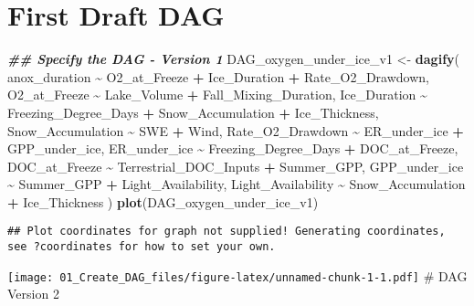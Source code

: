 \documentclass[
]{article}
\newenvironment{Shaded}{\begin{snugshade}}{\end{snugshade}}
\newcommand{\DocumentationTok}[1]{\textcolor[rgb]{0.56,0.35,0.01}{\textbf{\textit{#1}}}}
\newcommand{\FunctionTok}[1]{\textcolor[rgb]{0.13,0.29,0.53}{\textbf{#1}}}
\newcommand{\NormalTok}[1]{#1}
\newcommand{\OtherTok}[1]{\textcolor[rgb]{0.56,0.35,0.01}{#1}}
\newcommand{\SpecialCharTok}[1]{\textcolor[rgb]{0.81,0.36,0.00}{\textbf{#1}}}
\begin{document}
\section{First Draft DAG}\label{first-draft-dag}

\begin{Shaded}
\begin{Highlighting}[]
\DocumentationTok{\#\# Specify the DAG {-} Version 1}
\NormalTok{DAG\_oxygen\_under\_ice\_v1 }\OtherTok{\textless{}{-}} \FunctionTok{dagify}\NormalTok{(}
\NormalTok{  anox\_duration }\SpecialCharTok{\textasciitilde{}}\NormalTok{ O2\_at\_Freeze }\SpecialCharTok{+}\NormalTok{ Ice\_Duration }\SpecialCharTok{+}\NormalTok{ Rate\_O2\_Drawdown,}
\NormalTok{  O2\_at\_Freeze }\SpecialCharTok{\textasciitilde{}}\NormalTok{ Lake\_Volume }\SpecialCharTok{+}\NormalTok{ Fall\_Mixing\_Duration,}
\NormalTok{  Ice\_Duration }\SpecialCharTok{\textasciitilde{}}\NormalTok{ Freezing\_Degree\_Days }\SpecialCharTok{+}\NormalTok{ Snow\_Accumulation }\SpecialCharTok{+}\NormalTok{ Ice\_Thickness, }
\NormalTok{  Snow\_Accumulation }\SpecialCharTok{\textasciitilde{}}\NormalTok{ SWE }\SpecialCharTok{+}\NormalTok{ Wind,}
\NormalTok{  Rate\_O2\_Drawdown }\SpecialCharTok{\textasciitilde{}}\NormalTok{ ER\_under\_ice }\SpecialCharTok{+}\NormalTok{ GPP\_under\_ice, }
\NormalTok{  ER\_under\_ice }\SpecialCharTok{\textasciitilde{}}\NormalTok{ Freezing\_Degree\_Days }\SpecialCharTok{+}\NormalTok{ DOC\_at\_Freeze,}
\NormalTok{  DOC\_at\_Freeze }\SpecialCharTok{\textasciitilde{}}\NormalTok{ Terrestrial\_DOC\_Inputs }\SpecialCharTok{+}\NormalTok{ Summer\_GPP, }
\NormalTok{  GPP\_under\_ice }\SpecialCharTok{\textasciitilde{}}\NormalTok{ Summer\_GPP }\SpecialCharTok{+}\NormalTok{ Light\_Availability,}
\NormalTok{  Light\_Availability }\SpecialCharTok{\textasciitilde{}}\NormalTok{ Snow\_Accumulation }\SpecialCharTok{+}\NormalTok{ Ice\_Thickness}
\NormalTok{)}
\FunctionTok{plot}\NormalTok{(DAG\_oxygen\_under\_ice\_v1)}
\end{Highlighting}
\end{Shaded}

\begin{verbatim}
## Plot coordinates for graph not supplied! Generating coordinates, see ?coordinates for how to set your own.
\end{verbatim}

\texttt{[image: 01\_Create\_DAG\_files/figure-latex/unnamed-chunk-1-1.pdf]}
\# DAG Version 2
\end{document}
